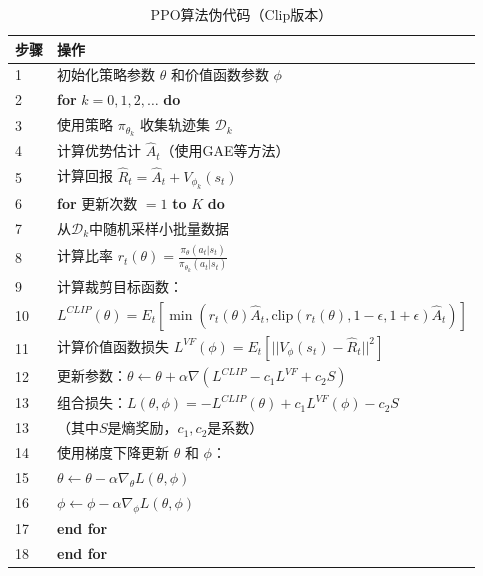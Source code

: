 \begin{table}[htbp]
\centering
\caption{PPO算法伪代码（Clip版本）}
\label{tab:ppo}
\begin{tabular}{lp{}}
\toprule
\textbf{步骤} & \textbf{操作} \\
\midrule
1 & 初始化策略参数 $\theta$ 和价值函数参数 $\phi$ \\
2 & \textbf{for} $k = 0, 1, 2, \ldots$ \textbf{do} \\
3 & \quad 使用策略 $\pi_{\theta_k}$ 收集轨迹集 $\mathcal{D}_k$ \\
4 & \quad 计算优势估计 $\hat{A}_t$（使用GAE等方法） \\
5 & \quad 计算回报 $\hat{R}_t = \hat{A}_t + V_{\phi_k}(s_t)$ \\
6 & \quad \textbf{for} 更新次数 $= 1$ \textbf{to} $K$ \textbf{do} \\
7 & \quad\quad 从$\mathcal{D}_k$中随机采样小批量数据 \\
8 & \quad\quad 计算比率 $r_t(\theta) = \frac{\pi_\theta(a_t|s_t)}{\pi_{\theta_k}(a_t|s_t)}$ \\
9 & \quad\quad 计算裁剪目标函数： \\
10 & \quad\quad $L^{CLIP}(\theta) = E_t[\min(r_t(\theta)\hat{A}_t, \text{clip}(r_t(\theta), 1-\epsilon, 1+\epsilon)\hat{A}_t)]$ \\
11 & \quad\quad 计算价值函数损失 $L^{VF}(\phi) = E_t[||V_\phi(s_t) - \hat{R}_t||^2]$ \\
12 & \quad\quad 更新参数：$\theta \leftarrow \theta + \alpha \nabla(L^{CLIP} - c_1 L^{VF} + c_2 S)$ \\
13 & \quad \quad 组合损失：$L(\theta, \phi) = -L^{CLIP}(\theta) + c_1 L^{VF}(\phi) - c_2 S$ \\
13 & \quad\quad （其中$S$是熵奖励，$c_1,c_2$是系数） \\
14 & \quad \quad 使用梯度下降更新 $\theta$ 和 $\phi$： \\
15& \quad \quad \quad $\theta \leftarrow \theta - \alpha \nabla_{\theta} L(\theta, \phi)$ \\
16& \quad \quad \quad $\phi \leftarrow \phi - \alpha \nabla_{\phi} L(\theta, \phi)$ \\
17 & \quad \textbf{end for} \\
18 & \textbf{end for} \\
\bottomrule
\end{tabular}
\end{table}

